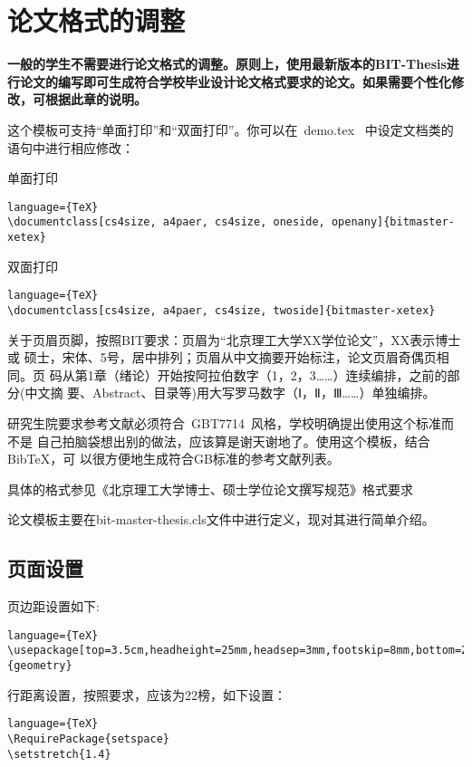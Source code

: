 

\chapter{论文格式的调整}
\label{sec:thesisformat}

\textbf{一般的学生不需要进行论文格式的调整。原则上，使用最新版本的BIT-Thesis进行论文的编写即可生成符合学校毕业设计论文格式要求的论文。如果需要个性化修改，可根据此章的说明。
}

这个模板可支持``单面打印''和``双面打印''。你可以在~demo.tex~
中设定文档类的语句中进行相应修改：

单面打印
\begin{lstlisting}language={TeX}
\documentclass[cs4size, a4paer, cs4size, oneside, openany]{bitmaster-xetex}
\end{lstlisting}

双面打印
\begin{lstlisting}language={TeX}
\documentclass[cs4size, a4paer, cs4size, twoside]{bitmaster-xetex}
\end{lstlisting}

关于页眉页脚，按照BIT要求：页眉为``北京理工大学XX学位论文''，XX表示博士或
硕士，宋体、5号，居中排列；页眉从中文摘要开始标注，论文页眉奇偶页相同。页
码从第1章（绪论）开始按阿拉伯数字（1，2，3……）连续编排，之前的部分(中文摘
要、Abstract、目录等)用大写罗马数字（Ⅰ，Ⅱ，Ⅲ……）单独编排。

研究生院要求参考文献必须符合~GBT7714~风格，学校明确提出使用这个标准而不是
自己拍脑袋想出别的做法，应该算是谢天谢地了。使用这个模板，结合BibTeX，可
以很方便地生成符合GB标准的参考文献列表。

具体的格式参见《北京理工大学博士、硕士学位论文撰写规范》格式要求

论文模板主要在bit-master-thesis.cls文件中进行定义，现对其进行简单介绍。
\section{页面设置}
页边距设置如下:
\begin{lstlisting}language={TeX}
\usepackage[top=3.5cm,headheight=25mm,headsep=3mm,footskip=8mm,bottom=2.5cm,left=2.7cm,right=2.7cm]{geometry}
\end{lstlisting}

行距离设置，按照要求，应该为22榜，如下设置：
\begin{lstlisting}language={TeX}
\RequirePackage{setspace}
\setstretch{1.4}
\end{lstlisting}

